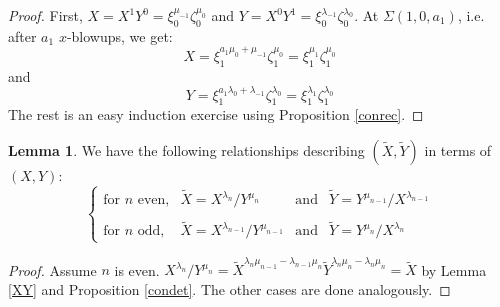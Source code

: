 \documentclass[11pt]{amsart}
\theoremstyle{definition}
\newtheorem{lem}[thm]{Lemma}
\begin{document}
{\begin{proof}
First, $X=X^{1}Y^{0}=\xi_0^{\mu_{-1}}\zeta_0^{\mu_0}$ and $Y=X^{0}Y^{1}=\xi_0^{\lambda_{-1}}\zeta_0^{\lambda_0}$. At $\Sigma(1,0,a_1)$, i.e. after $a_1$ $x$-blowups, we get:
\begin{equation*}
X=\xi_1^{a_1\mu_0+\mu_{-1}}\zeta_1^{\mu_0}=\xi_1^{\mu_1}\zeta_1^{\mu_0}
\end{equation*}
and
\begin{equation*}
Y=\xi_1^{a_1\lambda_0+\lambda_{-1}}\zeta_1^{\lambda_0}=\xi_1^{\lambda_1}\zeta_1^{\lambda_0}
\end{equation*}
The rest is an easy induction exercise using Proposition \ref{conrec}.
\end{proof}

\begin{lem} \label{XYtilde}
We have the following relationships describing $\left(\tilde X,\tilde Y\right)$ in terms of $\left(X,Y\right)$:
\begin{equation*}
\left\{
\begin{array}{llll}
\text{for } n \text{ even,} & \tilde X = X^{\lambda_n}/Y^{\mu_n} & \text{and} & \tilde Y = Y^{\mu_{n-1}}/X^{\lambda_{n-1}}
\\\\
\text{for } n \text{ odd,} & \tilde X = X^{\lambda_{n-1}}/Y^{\mu_{n-1}} & \text{and} & \tilde Y = Y^{\mu_n}/X^{\lambda_n}
\end{array}
\right.
\end{equation*}
\end{lem}

\begin{proof}
Assume $n$ is even. $X^{\lambda_n}/Y^{\mu_n}=\tilde X^{\lambda_n\mu_{n-1}-\lambda_{n-1}\mu_n}\tilde Y^{\lambda_n\mu_{n}-\lambda_{n}\mu_n}=\tilde X$ by Lemma \ref{XY} and Proposition \ref{condet}. The other cases are done analogously.
\end{proof}

}
\end{document}
